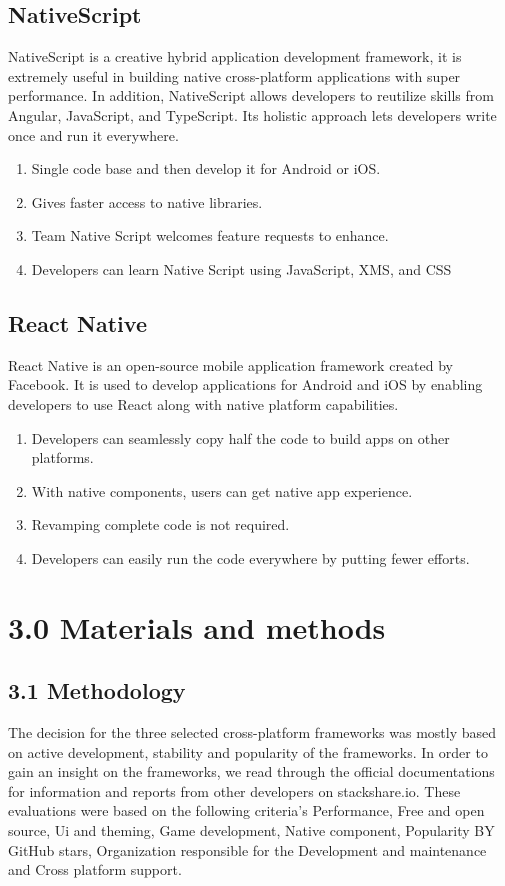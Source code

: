 \documentclass[12pt]{extreport}
\begin{document}
\subsection*{NativeScript}
NativeScript is a creative hybrid application development framework, it is extremely useful in building native cross-platform applications with super performance.
In addition, NativeScript allows developers to reutilize skills from Angular, JavaScript, and TypeScript. Its holistic approach lets developers write once and run it everywhere.
\begin{enumerate}
	\item{Single code base and then develop it for Android or iOS.}
	\item{Gives faster access to native libraries.}
	\item{Team Native Script welcomes feature requests to enhance.}
	\item{Developers can learn Native Script using JavaScript, XMS, and CSS}
\end{enumerate}

\subsection*{React Native}
React Native is an open-source mobile application framework created by Facebook. It is used to develop applications for Android and iOS by enabling developers to use React along with native platform capabilities. 
\begin{enumerate}
	\item{Developers can seamlessly copy half the code to build apps on other platforms.}
	\item{With native components, users can get native app experience.}
	\item{Revamping complete code is not required.}
	\item{Developers can easily run the code everywhere by putting fewer efforts.}
\end{enumerate}



\newpage
\section*{3.0 Materials and methods}
\subsection*{3.1 Methodology}

The decision for the three selected cross-platform frameworks was mostly based on active development, stability and popularity of the frameworks. In order to gain an insight on the frameworks, we read through the official documentations for information and reports from other developers on stackshare.io.
These evaluations were based on the following criteria’s Performance, Free and open source, Ui and theming, Game development, Native component, Popularity BY GitHub stars, Organization responsible for the Development and maintenance and Cross platform support.
\end{document}
